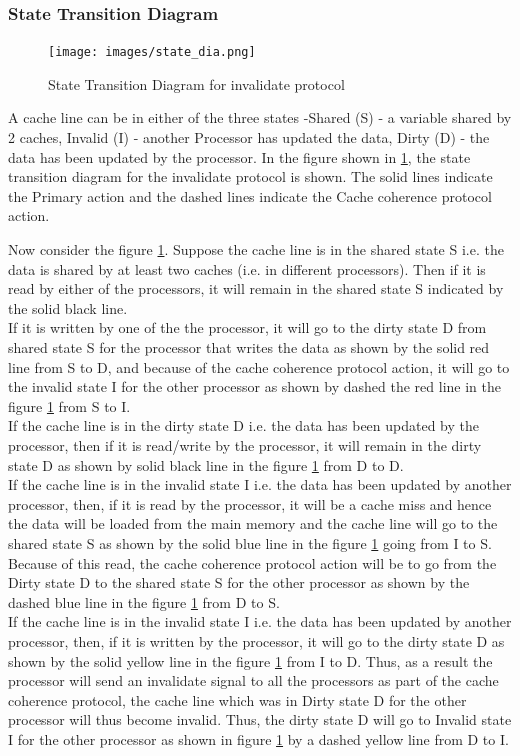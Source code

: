 \documentclass[12pt]{book}
\begin{document}
\subsubsection{State Transition Diagram}
\begin{figure}[H]
    \centering
    \texttt{[image: images/state\_dia.png]}
    \caption{State Transition Diagram for invalidate protocol}
    \label{fig:state_transition}
\end{figure}
A cache line can be in either of the three states -Shared (S) - a variable shared by 2 caches,
Invalid (I) - another Processor has updated the data, Dirty (D) - the data has been updated by the processor.
In the figure shown in \ref{fig:state_transition}, the state transition diagram for the invalidate protocol is shown.
The solid lines indicate the Primary action and the dashed lines indicate the Cache coherence protocol action.

Now consider the figure \ref{fig:state_transition}. Suppose the cache line is in the shared state S i.e. the data is shared by at least two caches (i.e. in different processors).
Then if it is read by either of the processors, it will remain in the shared state S indicated by the solid black line. \\
If it is written by one of the the processor, it will go to the dirty state D from shared 
state S for the processor that writes the data as shown by the solid red line from S to D, and because of the cache coherence protocol action, it will go to the invalid state I for the other processor as shown by dashed the red line in the
figure \ref{fig:state_transition} from S to I. \\
If the cache line is in the dirty state D i.e. the data has been updated by the processor, then if it is read/write by the processor, it will remain in the dirty state D as shown by solid black line in the figure \ref{fig:state_transition} from D to D.\\
If the cache line is in the invalid state I i.e. the data has been updated by another processor, then, if it is read by the processor, it will 
be a cache miss and hence the data will be loaded from the main memory and the cache line will go to the shared state S as shown by the solid blue line in the figure \ref{fig:state_transition} going from I to S.
Because of this read, the cache coherence protocol action will be to go from the Dirty state D to the shared state S for the other processor as shown by the dashed blue line in the figure \ref{fig:state_transition} from D to S.\\
If the cache line is in the invalid state I i.e. the data has been updated by another processor, then, if it is written by the processor, it will go to the dirty state D as shown by the solid yellow line in the figure \ref{fig:state_transition} from I to D.
Thus, as a result the processor will send an invalidate signal to all the processors as part of the cache coherence protocol, the cache line which was in Dirty state D for the other processor
will thus become invalid. Thus, the dirty state D will go to Invalid state I for the other processor as shown in figure \ref{fig:state_transition} by a dashed yellow line from D to I. \\
\end{document}
